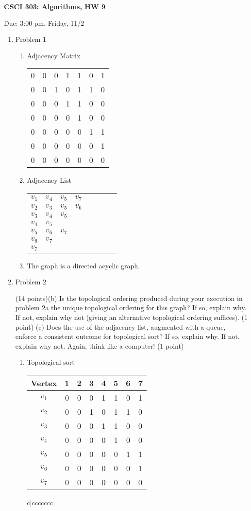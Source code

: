 \documentclass[11pt]{article}
\begin{document}
\begin{LARGE}
\centerline {\bf CSCI 303: Algorithms, HW 9}
\end{LARGE}
\vskip 0.25cm
\centerline{Due: 3:00 pm, Friday, 11/2}

\begin{enumerate}
\item Problem 1\\
\begin{enumerate}
\item Adjacency Matrix
\begin{tabular}{ccccccc}
0&0&0&1&1&0&1\\
0&0&1&0&1&1&0\\
0&0&0&1&1&0&0\\
0&0&0&0&1&0&0\\
0&0&0&0&0&1&1\\
0&0&0&0&0&0&1\\
0&0&0&0&0&0&0\\
\end{tabular}
\item Adjacency List
\begin{tabular}{c|ccccccc|}

$v_1$&$v_4$&$v_5$&$v_7$&&&\\
\hline
$v_2$&$v_3$&$v_5$&$v_6$&&&\\
\hline
$v_3$&$v_4$&$v_5$&&&&\\
\hline
$v_4$&$v_5$&&&&&\\
\hline
$v_5$&$v_6$&$v_7$&&&&\\
\hline
$v_6$&$v_7$&&&&&\\
\hline
$v_7$&&&&&&\\
\end{tabular}
\item The graph is a directed acyclic graph.
\end{enumerate}
\item Problem 2

(14 points)(b) Is the topological ordering produced during your execution in problem 2a the unique
topological ordering for this graph? If so, explain why. If not, explain why not (giving
an alternative topological ordering suffices). (1 point)
(c) Does the use of the adjacency list, augmented with a queue, enforce a consistent outcome
for topological sort? If so, explain why. If not, explain why not. Again, think like a
computer! (1 point)
\begin{enumerate}
\item Topological sort
\begin{tabular}{c|ccccccc}
\hline
Vertex& 1&2&3&4&5&6&7\\
\hline
$v_1$&0&0&0&1&1&0&1\\
$v_2$&0&0&1&0&1&1&0\\
$v_3$&0&0&0&1&1&0&0\\
$v_4$&0&0&0&0&1&0&0\\
$v_5$&0&0&0&0&0&1&1\\
$v_6$&0&0&0&0&0&0&1\\
$v_7$&0&0&0&0&0&0&0\\
\end{tabular}{c|ccccccc}


\end{enumerate}
\end{enumerate}
\end{document}
